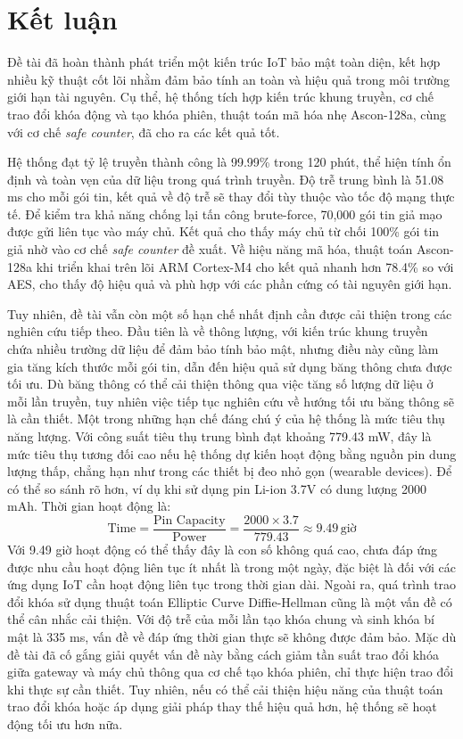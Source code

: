 \chapter{Kết luận}
\label{Chapter5}

Đề tài đã hoàn thành phát triển một kiến trúc IoT bảo mật toàn diện, kết hợp nhiều kỹ thuật cốt lõi nhằm đảm bảo tính an toàn và hiệu quả trong môi trường giới hạn tài nguyên. 
Cụ thể, hệ thống tích hợp kiến trúc khung truyền, cơ chế trao đổi khóa động và tạo khóa phiên, thuật toán mã hóa nhẹ Ascon-128a, cùng với cơ chế \textit{safe counter}, đã
cho ra các kết quả tốt. 

Hệ thống đạt tỷ lệ truyền thành công là 99.99\% trong 120 phút, thể hiện tính ổn định và toàn vẹn của dữ liệu trong quá trình truyền.
Độ trễ trung bình là 51.08 ms cho mỗi gói tin, kết quả về độ trễ sẽ thay đổi tùy thuộc vào tốc độ mạng thực tế. Để kiểm tra khả năng chống lại tấn công brute-force, 70,000
gói tin giả mạo được gửi liên tục vào máy chủ. Kết quả cho thấy máy chủ từ chối 100\% gói tin giả nhờ vào cơ chế \textit{safe counter} đề xuất. 
Về hiệu năng mã hóa, thuật toán Ascon-128a khi triển khai trên lõi ARM Cortex-M4 cho kết quả nhanh hơn 78.4\% so với AES, cho thấy độ hiệu quả 
và phù hợp với các phần cứng có tài nguyên giới hạn. 

Tuy nhiên, đề tài vẫn còn một số hạn chế nhất định cần được cải thiện trong các nghiên cứu tiếp theo. Đầu tiên là về thông lượng, với kiến trúc khung truyền chứa nhiều trường dữ liệu để đảm bảo tính bảo mật, nhưng điều này cũng làm gia tăng kích thước mỗi gói tin, dẫn đến hiệu quả sử dụng băng thông chưa được tối ưu. Dù băng thông có thể cải thiện thông qua việc tăng số lượng dữ liệu ở mỗi lần truyền, tuy nhiên việc tiếp tục nghiên cứu về hướng tối ưu băng thông sẽ là cần thiết.
Một trong những hạn chế đáng chú ý của hệ thống là mức tiêu thụ năng lượng. Với công suất tiêu thụ trung bình đạt khoảng 779.43 mW, đây là mức tiêu thụ tương đối cao nếu hệ thống dự kiến hoạt động bằng nguồn pin dung lượng thấp, chẳng hạn như trong các thiết bị đeo nhỏ gọn (wearable devices). Để có thể so sánh rõ hơn, ví dụ khi sử dụng pin Li-ion 3.7V 
có dung lượng 2000 mAh. Thời gian hoạt động là:
\[
    \text{Time} = \frac{\text{Pin Capacity}}{\text{Power}} = \frac{2000 \times 3.7 }{779.43} \approx 9.49 \, \text{giờ}
\]
Với 9.49 giờ hoạt động có thể thấy đây là con số không quá cao, chưa đáp ứng được nhu cầu hoạt động liên tục ít nhất là trong một ngày, đặc biệt là đối với các ứng dụng IoT cần hoạt động liên tục trong thời gian dài. Ngoài ra, quá trình trao đổi khóa sử dụng thuật toán
Elliptic Curve Diffie-Hellman cũng là một vấn đề có thể cân nhắc cải thiện. Với độ trễ của mỗi lần tạo khóa chung và sinh khóa bí mật là 335 ms, vấn đề về đáp ứng thời gian thực sẽ
không được đảm bảo. Mặc dù đề tài đã cố gắng giải quyết vấn đề này bằng cách giảm tần suất trao đổi khóa giữa gateway và máy chủ thông qua cơ chế tạo khóa phiên, chỉ thực hiện trao đổi khi thực sự cần thiết. Tuy nhiên, nếu có thể cải thiện hiệu năng của thuật toán trao đổi khóa hoặc áp dụng giải pháp thay thế hiệu quả hơn, hệ thống sẽ hoạt động tối ưu hơn nữa.

